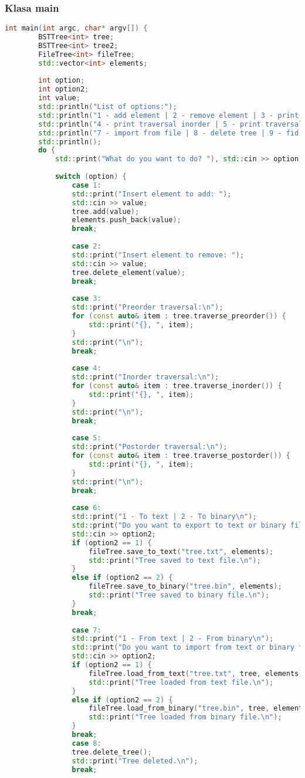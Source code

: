 \subsubsection{Klasa main}
\begin{lstlisting}[caption=Klasa \texttt{main}, label={lst:main-class}, language=C++]
	int main(int argc, char* argv[]) {
		BSTTree<int> tree;
		BSTTree<int> tree2;
		FileTree<int> fileTree;
		std::vector<int> elements;
		
		int option;
		int option2;
		int value;
		std::println("List of options:");
		std::println("1 - add element | 2 - remove element | 3 - print traversal preordern");
		std::println("4 - print traversal inorder | 5 - print traversal postorder | 6 - export to file");
		std::println("7 - import from file | 8 - delete tree | 9 - fid path to element");
		std::println();
		do {
			std::print("What do you want to do? "), std::cin >> option;
			
			switch (option) {
				case 1:
				std::print("Insert element to add: ");
				std::cin >> value;
				tree.add(value);
				elements.push_back(value);
				break;
				
				case 2:
				std::print("Insert element to remove: ");
				std::cin >> value;
				tree.delete_element(value);
				break;
				
				case 3:
				std::print("Preorder traversal:\n");
				for (const auto& item : tree.traverse_preorder()) {
					std::print("{}, ", item);
				}
				std::print("\n");
				break;
				
				case 4:
				std::print("Inorder traversal:\n");
				for (const auto& item : tree.traverse_inorder()) {
					std::print("{}, ", item);
				}
				std::print("\n");
				break;
				
				case 5:
				std::print("Postorder traversal:\n");
				for (const auto& item : tree.traverse_postorder()) {
					std::print("{}, ", item);
				}
				std::print("\n");
				break;
				
				case 6:
				std::print("1 - To text | 2 - To binary\n");
				std::print("Do you want to export to text or binary file? ");
				std::cin >> option2;
				if (option2 == 1) {
					fileTree.save_to_text("tree.txt", elements);
					std::print("Tree saved to text file.\n");
				}
				else if (option2 == 2) {
					fileTree.save_to_binary("tree.bin", elements);
					std::print("Tree saved to binary file.\n");
				}
				break;
				
				case 7:
				std::print("1 - From text | 2 - From binary\n");
				std::print("Do you want to import from text or binary file? ");
				std::cin >> option2;
				if (option2 == 1) {
					fileTree.load_from_text("tree.txt", tree, elements);
					std::print("Tree loaded from text file.\n");
				}
				else if (option2 == 2) {
					fileTree.load_from_binary("tree.bin", tree, elements);
					std::print("Tree loaded from binary file.\n");
				}
				break;
				case 8:
				tree.delete_tree();
				std::print("Tree deleted.\n");
				break;
				

\end{lstlisting}
